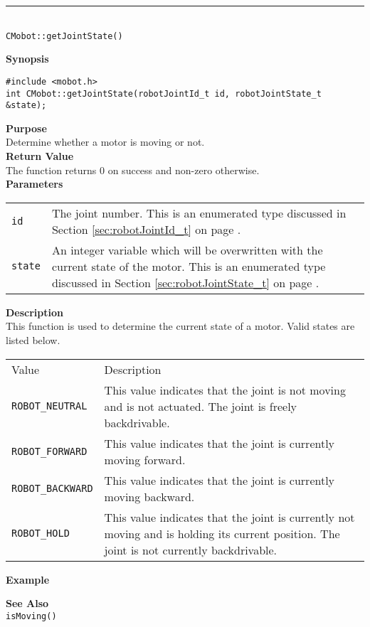 \noindent
\vspace{5pt}
\rule{4.5in}{0.015in}\\
\noindent
{\LARGE \texttt{CMobot::getJointState()}}\\
{}

\noindent
{\bf Synopsis}
\vspace{-8pt}
\begin{verbatim}
#include <mobot.h>
int CMobot::getJointState(robotJointId_t id, robotJointState_t &state);
\end{verbatim}

\noindent
{\bf Purpose}\\
Determine whether a motor is moving or not.\\

\noindent
{\bf Return Value}\\
The function returns 0 on success and non-zero otherwise.\\

\noindent
{\bf Parameters}
\vspace{-0.1in}
\begin{description}
\item               
\begin{tabular}{p{10 mm}p{145 mm}}
\texttt{id} & The joint number. This is an enumerated type 
discussed in Section \ref{sec:robotJointId_t} on page
\pageref{sec:robotJointId_t}.\\
\texttt{state} & An integer variable which will be overwritten with the current state of the motor. 
This is an enumerated type 
discussed in Section \ref{sec:robotJointState_t} on page
\pageref{sec:robotJointState_t}.
\end{tabular}
\end{description}

\noindent
{\bf Description}\\
This function is used to determine the current state of a motor. Valid states are listed below.

\begin{tabular}{p{3.3cm}p{10cm}} \hline 
Value & Description \\
\texttt{ROBOT\_NEUTRAL}& This value indicates that the joint is not moving and is not actuated. The joint is freely backdrivable. \\
\texttt{ROBOT\_FORWARD}& This value indicates that the joint is currently moving forward. \\
\texttt{ROBOT\_BACKWARD}& This value indicates that the joint is currently moving backward. \\
\texttt{ROBOT\_HOLD}& This value indicates that the joint is currently not moving and is holding its current position. The joint is not currently backdrivable. \\
\hline
\end{tabular}


\noindent
{\bf Example}\\
\noindent

\noindent
{\bf See Also}\\
\texttt{isMoving()}
